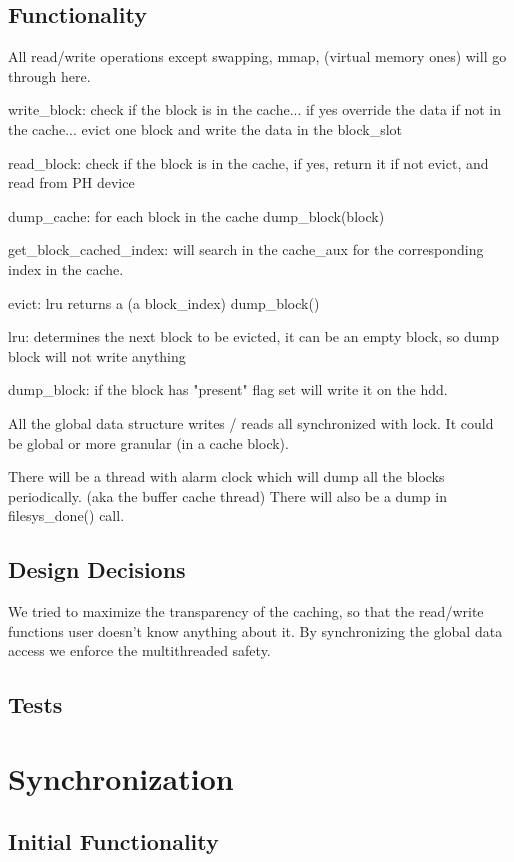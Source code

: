 \subsection{Functionality}
All read/write operations except swapping, mmap, (virtual memory ones) will go through here.  

write\_block:
	check if the block is in the cache... if yes override the data
	if not in the cache... evict one block and write the data in the block\_slot

read\_block:
	check if the block is in the cache, if yes, return it
	if not evict, and read from PH device

dump\_cache:
	for each block in the cache
		dump\_block(block)

get\_block\_cached\_index:
	will search in the cache\_aux for the corresponding index in the cache.

evict: 
	lru returns a (a block\_index)
	dump\_block()

lru: determines the next block to be evicted, it can be an empty block, so dump block will not write anything


dump\_block:
	if the block has "present" flag set will write it on the hdd.


All the global data structure writes / reads all synchronized with lock. It could be global or more granular (in a cache block).

There will be a thread with alarm clock which will dump all the blocks periodically.  (aka the buffer cache thread)
There will also be a dump in  filesys\_done() call.




\subsection{Design Decisions}

We tried to maximize the transparency of the caching, so that the read/write functions user doesn't know anything about it. By synchronizing the global data access we enforce the multithreaded safety.


\subsection{Tests}


\section{Synchronization}
\subsection{Initial Functionality}

